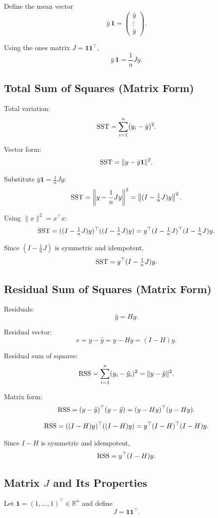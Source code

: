 Define the mean vector
\[
\bar{y}\,\mathbf{1}=
\begin{pmatrix}
\bar{y}\\
\vdots\\
\bar{y}
\end{pmatrix}.
\]

Using the ones matrix $J=\mathbf{1}\mathbf{1}^{\top}$,
\[
\bar{y}\,\mathbf{1}=\frac{1}{n}Jy.
\]

\subsection{Total Sum of Squares (Matrix Form)}

Total variation:
\[
\mathrm{SST}=\sum_{i=1}^n (y_i-\bar{y})^2.
\]

Vector form:
\[
\mathrm{SST}=\|y-\bar{y}\mathbf{1}\|^2.
\]

Substitute $\bar{y}\mathbf{1}=\frac{1}{n}Jy$:
\[
\mathrm{SST}=\left\|y-\frac{1}{n}Jy\right\|^2
=\left\|(I-\tfrac{1}{n}J)y\right\|^2.
\]

Using $\|x\|^2=x^{\top}x$:
\[
\mathrm{SST}=((I-\tfrac{1}{n}J)y)^{\top}((I-\tfrac{1}{n}J)y)
= y^{\top}(I-\tfrac{1}{n}J)^{\top}(I-\tfrac{1}{n}J)y.
\]

Since $(I-\tfrac{1}{n}J)$ is symmetric and idempotent,
\[
\mathrm{SST} = y^{\top}(I-\tfrac{1}{n}J)y.
\]

\subsection{Residual Sum of Squares (Matrix Form)}

Residuals:
\[
\hat{y} = Hy.
\]

Residual vector:
\[
e = y-\hat{y} = y-Hy = (I-H)y.
\]

Residual sum of squares:
\[
\mathrm{RSS}=\sum_{i=1}^n (y_i-\hat{y}_i)^2
=\|y-\hat{y}\|^2.
\]

Matrix form:
\[
\mathrm{RSS}=(y-\hat{y})^{\top}(y-\hat{y})
=(y-Hy)^{\top}(y-Hy).
\]

\[
\mathrm{RSS}=((I-H)y)^{\top}((I-H)y)
= y^{\top}(I-H)^{\top}(I-H)y.
\]

Since $I-H$ is symmetric and idempotent,
\[
\mathrm{RSS} = y^{\top}(I-H)y.
\]

\subsection{Matrix $J$ and Its Properties}

Let $\mathbf{1}=(1,\dots,1)^\top \in \mathbb{R}^n$ and define
\[
J=\mathbf{1}\mathbf{1}^\top.
\]


